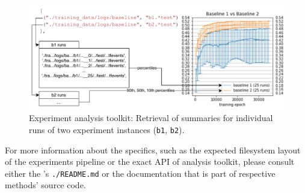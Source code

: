\begin{figure}[ht]
    \centering
    \includegraphics[width=1\textwidth]{../figures/03_msc-neuro_2}
    \caption[Experiment analysis toolkit]{Experiment analysis toolkit: Retrieval of summaries for individual runs of two experiment instances (\texttt{b1}, \texttt{b2}).}
    \label{fig:3.4}
\end{figure}

For more information about the specifics, such as the expected filesystem layout of the experiments pipeline or the exact API of analysis toolkit, please consult either the ’s \texttt{./README.md} or the documentation that is part of respective methods’ source code. 
